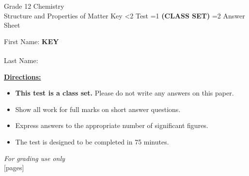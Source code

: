 \documentclass[addpoints]{exam}
\newcommand{\event}{Structure and Properties of Matter}
\newcommand{\tournament}{}  %
\def\type{0}
\begin{document}
\begin{center}
    {\huge Grade 12 Chemistry \\ \event
    \ifprintanswers
     \space Key
    \else
     \space \ifnum\type<2 Test \fi \ifnum\type=1 \textbf{(CLASS SET)} \fi \ifnum\type=2 Answer Sheet \fi
    \fi \\ \vspace{3mm}\tournament\vspace{1mm}}
\end{center}

\vspace{.25\textheight}

\begin{center}
    First Name: \ifprintanswers
    \underline{\hspace{3.5cm}}\textbf{KEY}\underline{\hspace{5.5cm}}\\\vspace{5mm}
    \else
        \underline{\hspace{10cm}}\\ \vspace{5mm}
    \fi
    Last Name: \underline{\hspace{10cm}}\\ \vspace{5mm}
\end{center}

\noindent\textbf{\underline{Directions:}}
\begin{itemize}
    \ifnum\type=1 \item \textbf{This test is a class set.} Please do not write any answers on this paper. \fi
    \item Show all work for full marks on short answer questions.
    \item Express answers to the appropriate number of significant figures.
    \item The test is designed to be completed in 75 minutes.
\end{itemize}
\begin{center}
\textit{For grading use only}\\
[pages]
\end{center}
\end{document}

